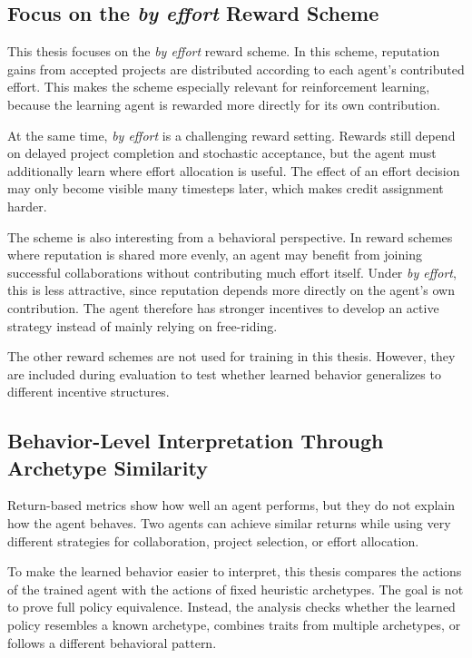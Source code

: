 \documentclass[english,bachelor]{hsluthesis}
\begin{document}
\subsection{Focus on the \textit{by effort} Reward Scheme}

This thesis focuses on the \textit{by effort} reward scheme. In this scheme, reputation gains from accepted projects are distributed according to each agent's contributed effort. This makes the scheme especially relevant for reinforcement learning, because the learning agent is rewarded more directly for its own contribution.

At the same time, \textit{by effort} is a challenging reward setting. Rewards still depend on delayed project completion and stochastic acceptance, but the agent must additionally learn where effort allocation is useful. The effect of an effort decision may only become visible many timesteps later, which makes credit assignment harder.

The scheme is also interesting from a behavioral perspective. In reward schemes where reputation is shared more evenly, an agent may benefit from joining successful collaborations without contributing much effort itself. Under \textit{by effort}, this is less attractive, since reputation depends more directly on the agent's own contribution. The agent therefore has stronger incentives to develop an active strategy instead of mainly relying on free-riding.

The other reward schemes are not used for training in this thesis. However, they are included during evaluation to test whether learned behavior generalizes to different incentive structures.

\subsection{Behavior-Level Interpretation Through Archetype Similarity}

Return-based metrics show how well an agent performs, but they do not explain how the agent behaves. Two agents can achieve similar returns while using very different strategies for collaboration, project selection, or effort allocation.

To make the learned behavior easier to interpret, this thesis compares the actions of the trained agent with the actions of fixed heuristic archetypes. The goal is not to prove full policy equivalence. Instead, the analysis checks whether the learned policy resembles a known archetype, combines traits from multiple archetypes, or follows a different behavioral pattern.
\end{document}
